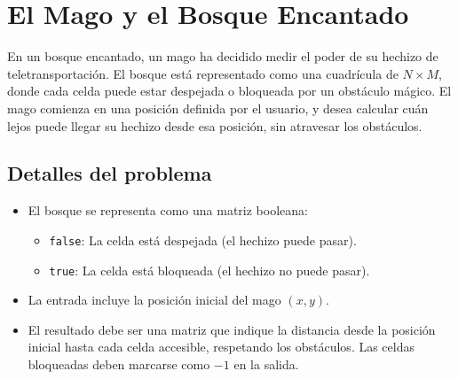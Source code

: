 


\section{El Mago y el Bosque Encantado}

En un bosque encantado, un mago ha decidido medir el poder de su hechizo de teletransportación. El bosque está representado como una cuadrícula de \(N \times M\), donde cada celda puede estar despejada o bloqueada por un obstáculo mágico. El mago comienza en una posición definida por el usuario, y desea calcular cuán lejos puede llegar su hechizo desde esa posición, sin atravesar los obstáculos.

\subsection*{Detalles del problema}

\begin{itemize}
    \item El bosque se representa como una matriz booleana: 
    \begin{itemize}
        \item \texttt{false}: La celda está despejada (el hechizo puede pasar).  
        \item \texttt{true}: La celda está bloqueada (el hechizo no puede pasar).  
    \end{itemize}
    \item La entrada incluye la posición inicial del mago \((x, y)\).  
    \item El resultado debe ser una matriz que indique la distancia desde la posición inicial hasta cada celda accesible, respetando los obstáculos. Las celdas bloqueadas deben marcarse como \(-1\) en la salida.  
\end{itemize}

